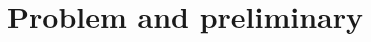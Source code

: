 \documentclass[pdflatex,sn-mathphys-num]{sn-jnl}%
\theoremstyle{thmstyleone}%
\theoremstyle{thmstyletwo}%
\theoremstyle{thmstylethree}%
\begin{document}




\section{Problem and preliminary}
\end{document}
